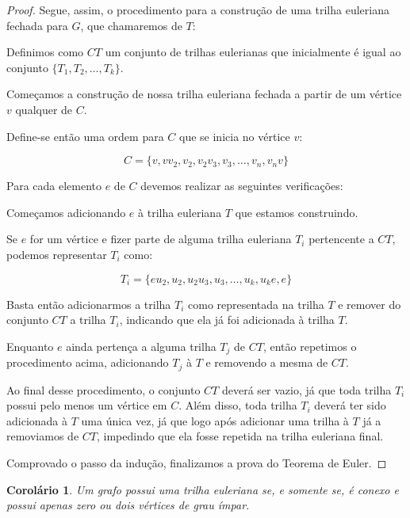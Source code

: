 \documentclass{article}
\newtheorem{corollary}{Corolário}
\begin{document}
\begin{proof}
Segue, assim, o procedimento para a construção de uma trilha euleriana fechada para $G$, que chamaremos de $T$:


Definimos como $CT$ um conjunto de trilhas eulerianas que inicialmente é igual ao conjunto $\{T_1, T_2, \dots, T_k\}$.

Começamos a construção de nossa trilha euleriana fechada a partir de um vértice $v$ qualquer de $C$.

Define-se então uma ordem para $C$ que se inicia no vértice $v$:

\[
	C = \{v, vv_2, v_2, v_2v_3, v_3, \dots, v_n, v_nv\}
\]

Para cada elemento $e$ de $C$ devemos realizar as seguintes verificações:

Começamos adicionando $e$ à trilha euleriana $T$ que estamos construindo.

Se $e$ for um vértice e fizer parte de alguma trilha euleriana $T_i$ pertencente a $CT$, podemos representar $T_i$ como:

\[
	T_i = \{eu_2, u_2, u_2u_3, u_3, \dots, u_k, u_ke, e\}
\]

Basta então adicionarmos a trilha $T_i$ como representada na trilha $T$ e remover do conjunto $CT$ a trilha $T_i$, indicando que ela já foi adicionada à trilha $T$.

Enquanto $e$ ainda pertença a alguma trilha $T_j$ de $CT$, então repetimos o procedimento acima, adicionando $T_j$ à $T$ e removendo a mesma de $CT$.


Ao final desse procedimento, o conjunto $CT$ deverá ser vazio, já que toda trilha $T_i$ possui pelo menos um vértice em $C$. Além disso, toda trilha $T_i$ deverá ter sido adicionada à $T$ uma única vez, já que logo após adicionar uma trilha à $T$ já a removiamos de $CT$, impedindo que ela fosse repetida na trilha euleriana final.

Comprovado o passo da indução, finalizamos a prova do Teorema de Euler.

\end{proof}

\begin{corollary}
    Um grafo possui uma trilha euleriana se, e somente se, é conexo e possui apenas zero ou dois vértices de grau ímpar.
\end{corollary}
\end{document}
